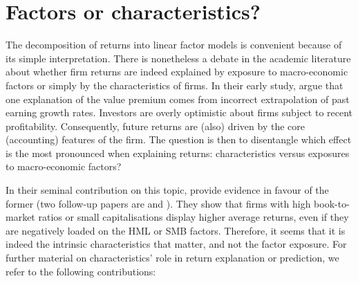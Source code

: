 \documentclass[]{krantz}
\theoremstyle{definition}
\theoremstyle{definition}
\theoremstyle{definition}
\theoremstyle{remark}
\begin{document}
\hypertarget{factors-or-characteristics}{%
\section{Factors or characteristics?}\label{factors-or-characteristics}}

The decomposition of returns into linear factor models is convenient
because of its simple interpretation. There is nonetheless a debate in
the academic literature about whether firm returns are indeed explained
by exposure to macro-economic factors or simply by the characteristics
of firms. In their early study, \citet{lakonishok1994contrarian} argue
that one explanation of the value premium comes from incorrect
extrapolation of past earning growth rates. Investors are overly
optimistic about firms subject to recent profitability. Consequently,
future returns are (also) driven by the core (accounting) features of
the firm. The question is then to disentangle which effect is the most
pronounced when explaining returns: characteristics versus exposures to
macro-economic factors?

In their seminal contribution on this topic, \citet{daniel1997evidence}
provide evidence in favour of the former (two follow-up papers are
\citet{daniel2001explaining} and \citet{daniel2012testing}). They show
that firms with high book-to-market ratios or small capitalisations
display higher average returns, even if they are negatively loaded on
the HML or SMB factors. Therefore, it seems that it is indeed the
intrinsic characteristics that matter, and not the factor exposure. For
further material on characteristics' role in return explanation or
prediction, we refer to the following contributions:
\end{document}
